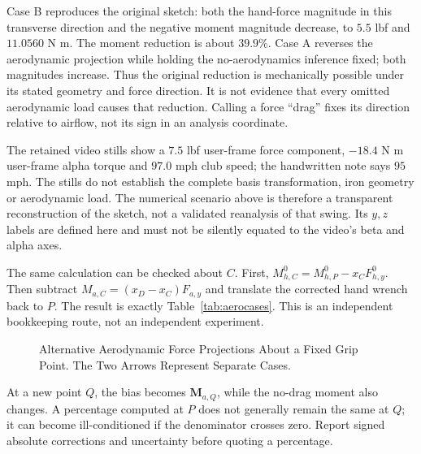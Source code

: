\documentclass[11pt,a4paper]{article}
\newcommand{\vect}[1]{\boldsymbol{#1}}
\begin{document}
Case B reproduces the original sketch: both the hand-force magnitude in this transverse direction and the negative moment magnitude decrease, to $5.5$ lbf and $11.0560$ N m. The moment reduction is about $39.9\%$. Case A reverses the aerodynamic projection while holding the no-aerodynamics inference fixed; both magnitudes increase. Thus the original reduction is mechanically possible under its stated geometry and force direction. It is not evidence that every omitted aerodynamic load causes that reduction. Calling a force ``drag'' fixes its direction relative to airflow, not its sign in an analysis coordinate.

The retained video stills show a $7.5$ lbf user-frame force component, $-18.4$ N m user-frame alpha torque and $97.0$ mph club speed; the handwritten note says $95$ mph. The stills do not establish the complete basis transformation, iron geometry or aerodynamic load. The numerical scenario above is therefore a transparent reconstruction of the sketch, not a validated reanalysis of that swing. Its $y,z$ labels are defined here and must not be silently equated to the video's beta and alpha axes.

The same calculation can be checked about $C$. First,
$M_{h,C}^0=M_{h,P}^0-x_CF_{h,y}^0$.
Then subtract $M_{a,C}=(x_D-x_C)F_{a,y}$ and translate the corrected hand wrench back to $P$. The result is exactly Table~\ref{tab:aerocases}. This is an independent bookkeeping route, not an independent experiment.

\begin{figure}[htbp]\centering
{}
\caption{Alternative Aerodynamic Force Projections About a Fixed Grip Point. The Two Arrows Represent Separate Cases.}
\label{fig:drag_effect}\end{figure}

At a new point $Q$, the bias becomes $\vect M_{a,Q}$, while the no-drag moment also changes. A percentage computed at $P$ does not generally remain the same at $Q$; it can become ill-conditioned if the denominator crosses zero. Report signed absolute corrections and uncertainty before quoting a percentage.
\end{document}

